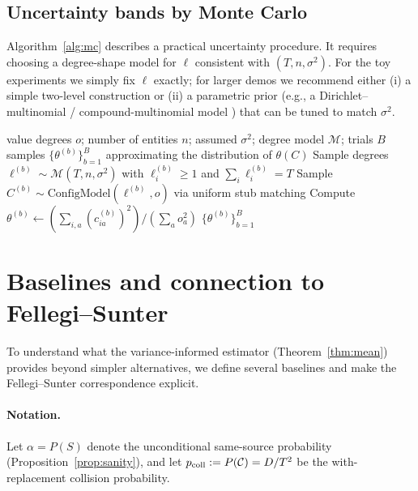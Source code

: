 \documentclass[11pt]{article}
\newcommand{\1}{\mathbf{1}}
\newcommand{\coll}{\mathcal{C}} %
\theoremstyle{plain}
\theoremstyle{definition}
\begin{document}
\subsection{Uncertainty bands by Monte Carlo}
Algorithm~\ref{alg:mc} describes a practical uncertainty procedure.
It requires choosing a degree-shape model for $\ell$ consistent with $(T,n,\sigma^2)$.
For the toy experiments we simply fix $\ell$ exactly; for larger demos we recommend either (i) a simple two-level construction or (ii) a parametric prior (e.g., a Dirichlet--multinomial / compound-multinomial model \cite{mosimann1962,minka2000}) that can be tuned to match $\sigma^2$.

\begin{algorithm}[htbp]
\caption{Monte Carlo distribution of $\theta(C)$ for uncertainty bands}
\label{alg:mc}
\begin{algorithmic}[1]
\setlength\itemsep{3pt}
\Require value degrees $o$; number of entities $n$; assumed $\sigma^2$; degree model $\mathcal{M}$; trials $B$
\Ensure samples $\{\theta^{(b)}\}_{b=1}^B$ approximating the distribution of $\theta(C)$
  \State Sample degrees $\ell^{(b)} \sim \mathcal{M}(T,n,\sigma^2)$ with $\ell_i^{(b)}\ge 1$ and $\sum_i \ell_i^{(b)}=T$
  \State Sample $C^{(b)} \sim \text{ConfigModel}(\ell^{(b)},o)$ via uniform stub matching
  \State Compute $\theta^{(b)} \gets \left(\sum_{i,a} (c^{(b)}_{ia})^2\right) / \left(\sum_a o_a^2\right)$
\EndFor
\State \Return $\{\theta^{(b)}\}_{b=1}^B$
\end{algorithmic}
\end{algorithm}

\section{Baselines and connection to Fellegi--Sunter}
\label{sec:baselines}

To understand what the variance-informed estimator (Theorem~\ref{thm:mean}) provides beyond simpler alternatives,
we define several baselines and make the Fellegi--Sunter correspondence explicit.

\paragraph{Notation.}
Let $\alpha = P(S)$ denote the unconditional same-source probability (Proposition~\ref{prop:sanity}),
and let $p_{\rm coll} := P(\coll) = D/T^2$ be the with-replacement collision probability.
\end{document}
